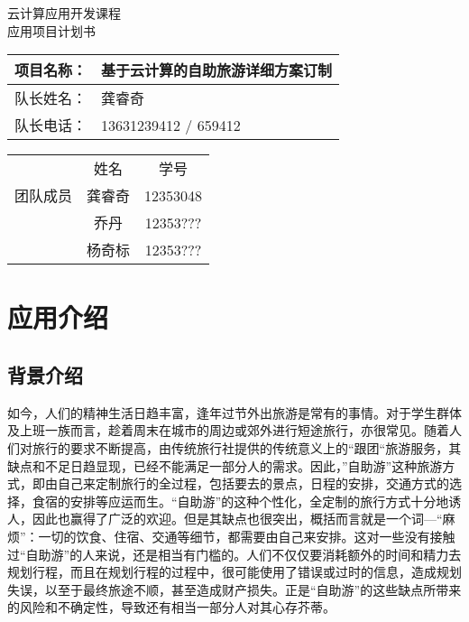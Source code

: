 \documentclass[12pt,a4paper]{article}
\begin{document}
\begin{CJK}{UTF8}{gbsn}

\begin{titlepage}
\begin{center}
\textsc{\Huge 云计算应用开发课程}\\[0.5cm]
\textsc{\LARGE 应用项目计划书}\\[2.5cm]

\begin{tabular}{ |l|l| }
	\hline
	项目名称： & 基于云计算的自助旅游详细方案订制\\ \hline
	队长姓名： & 龚睿奇\\ \hline
	队长电话： & 13631239412 {\slash} 659412\\
	\hline
\end{tabular}
\end{center}
\vspace{10cm}
\begin{center}
\begin{tabular}{ |c|c|c| }
	\hline
		 & 姓名   & 学号	\\ \cline{2-3}
	团队成员 & 龚睿奇 & 12353048	\\ \cline{2-3}
		 & 乔丹   & 12353???	\\ \cline{2-3}
		 & 杨奇标 & 12353???	\\
	\hline
\end{tabular}
\end{center}

\end{titlepage}

\section{应用介绍}
	\subsection{背景介绍}
	如今，人们的精神生活日趋丰富，逢年过节外出旅游是常有的事情。对于学生群体及上班一族而言，趁着周末在城市的周边或郊外进行短途旅行，亦很常见。随着人们对旅行的要求不断提高，由传统旅行社提供的传统意义上的“跟团“旅游服务，其缺点和不足日趋显现，已经不能满足一部分人的需求。因此，”自助游”这种旅游方式，即由自己来定制旅行的全过程，包括要去的景点，日程的安排，交通方式的选择，食宿的安排等应运而生。“自助游”的这种个性化，全定制的旅行方式十分地诱人，因此也赢得了广泛的欢迎。但是其缺点也很突出，概括而言就是一个词---“麻烦”：一切的饮食、住宿、交通等细节，都需要由自己来安排。这对一些没有接触过“自助游”的人来说，还是相当有门槛的。人们不仅仅要消耗额外的时间和精力去规划行程，而且在规划行程的过程中，很可能使用了错误或过时的信息，造成规划失误，以至于最终旅途不顺，甚至造成财产损失。正是“自助游”的这些缺点所带来的风险和不确定性，导致还有相当一部分人对其心存芥蒂。


\end{CJK}
\end{document}
